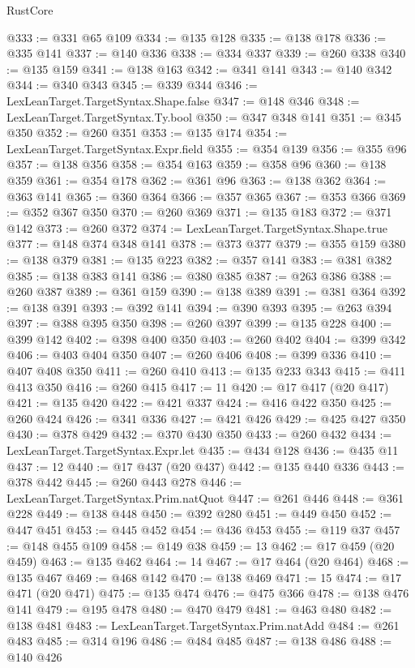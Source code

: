 \begin{lexlean}{RustCore}
\begin{coremodule}
@333 := @331 @65 @109
@334 := @135 @128
@335 := @138 @178
@336 := @335 @141
@337 := @140 @336
@338 := @334 @337
@339 := @260 @338
@340 := @135 @159
@341 := @138 @163
@342 := @341 @141
@343 := @140 @342
@344 := @340 @343
@345 := @339 @344
@346 := LexLeanTarget.TargetSyntax.Shape.false
@347 := @148 @346
@348 := LexLeanTarget.TargetSyntax.Ty.bool
@350 := @347 @348 @141
@351 := @345 @350
@352 := @260 @351
@353 := @135 @174
@354 := LexLeanTarget.TargetSyntax.Expr.field
@355 := @354 @139
@356 := @355 @96
@357 := @138 @356
@358 := @354 @163
@359 := @358 @96
@360 := @138 @359
@361 := @354 @178
@362 := @361 @96
@363 := @138 @362
@364 := @363 @141
@365 := @360 @364
@366 := @357 @365
@367 := @353 @366
@369 := @352 @367 @350
@370 := @260 @369
@371 := @135 @183
@372 := @371 @142
@373 := @260 @372
@374 := LexLeanTarget.TargetSyntax.Shape.true
@377 := @148 @374 @348 @141
@378 := @373 @377
@379 := @355 @159
@380 := @138 @379
@381 := @135 @223
@382 := @357 @141
@383 := @381 @382
@385 := @138 @383 @141
@386 := @380 @385
@387 := @263 @386
@388 := @260 @387
@389 := @361 @159
@390 := @138 @389
@391 := @381 @364
@392 := @138 @391
@393 := @392 @141
@394 := @390 @393
@395 := @263 @394
@397 := @388 @395 @350
@398 := @260 @397
@399 := @135 @228
@400 := @399 @142
@402 := @398 @400 @350
@403 := @260 @402
@404 := @399 @342
@406 := @403 @404 @350
@407 := @260 @406
@408 := @399 @336
@410 := @407 @408 @350
@411 := @260 @410
@413 := @135 @233 @343
@415 := @411 @413 @350
@416 := @260 @415
@417 := 11
@420 := @17 @417 (@20 @417)
@421 := @135 @420
@422 := @421 @337
@424 := @416 @422 @350
@425 := @260 @424
@426 := @341 @336
@427 := @421 @426
@429 := @425 @427 @350
@430 := @378 @429
@432 := @370 @430 @350
@433 := @260 @432
@434 := LexLeanTarget.TargetSyntax.Expr.let
@435 := @434 @128
@436 := @435 @11
@437 := 12
@440 := @17 @437 (@20 @437)
@442 := @135 @440 @336
@443 := @378 @442
@445 := @260 @443 @278
@446 := LexLeanTarget.TargetSyntax.Prim.natQuot
@447 := @261 @446
@448 := @361 @228
@449 := @138 @448
@450 := @392 @280
@451 := @449 @450
@452 := @447 @451
@453 := @445 @452
@454 := @436 @453
@455 := @119 @37
@457 := @148 @455 @109
@458 := @149 @38
@459 := 13
@462 := @17 @459 (@20 @459)
@463 := @135 @462
@464 := 14
@467 := @17 @464 (@20 @464)
@468 := @135 @467
@469 := @468 @142
@470 := @138 @469
@471 := 15
@474 := @17 @471 (@20 @471)
@475 := @135 @474
@476 := @475 @366
@478 := @138 @476 @141
@479 := @195 @478
@480 := @470 @479
@481 := @463 @480
@482 := @138 @481
@483 := LexLeanTarget.TargetSyntax.Prim.natAdd
@484 := @261 @483
@485 := @314 @196
@486 := @484 @485
@487 := @138 @486
@488 := @140 @426

\end{coremodule}
\end{lexlean}
